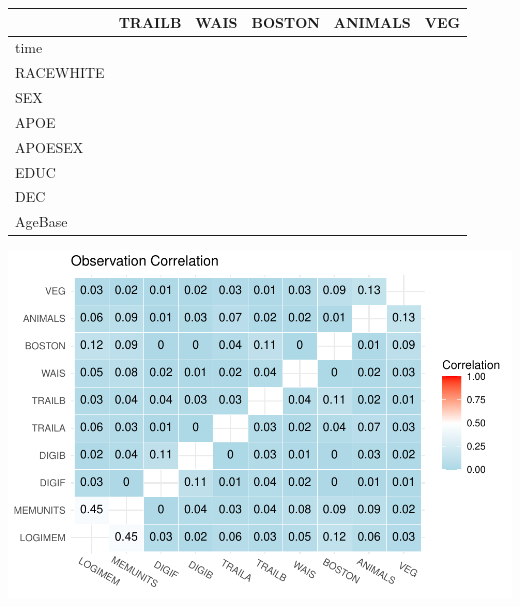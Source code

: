 \documentclass[
]{article}
\begin{document}
\begin{longtable}[t]{l|l|l|l|l|l}
\hline
  & TRAILB & WAIS & BOSTON & ANIMALS & VEG\\
\hline
time & \cellcolor{red}{-0.46 (-0.65, -0.25)} & \cellcolor{red}{-0.19 (-0.34, -0.02)} & \cellcolor{white}{-0.06 (-0.28, 0.12)} & \cellcolor{red}{-0.20 (-0.37, -0.02)} & \cellcolor{white}{-0.13 (-0.32, 0.05)}\\
\hline
RACEWHITE & \cellcolor{white}{-0.06 (-0.24, 0.11)} & \cellcolor{red}{-0.24 (-0.36, -0.11)} & \cellcolor{white}{-0.13 (-0.28, 0.02)} & \cellcolor{red}{-0.31 (-0.45, -0.18)} & \cellcolor{red}{-0.30 (-0.44, -0.15)}\\
\hline
SEX & \cellcolor{white}{0.06 (-0.07, 0.19)} & \cellcolor{white}{0.02 (-0.08, 0.12)} & \cellcolor{red}{-0.16 (-0.28, -0.03)} & \cellcolor{white}{-0.08 (-0.20, 0.03)} & \cellcolor{red}{-0.16 (-0.27, -0.05)}\\
\hline
APOE & \cellcolor{white}{-0.05 (-0.23, 0.12)} & \cellcolor{white}{-0.02 (-0.16, 0.10)} & \cellcolor{white}{-0.05 (-0.22, 0.13)} & \cellcolor{white}{-0.11 (-0.27, 0.05)} & \cellcolor{white}{-0.13 (-0.30, 0.03)}\\
\hline
APOESEX & \cellcolor{white}{-0.18 (-0.40, 0.05)} & \cellcolor{white}{-0.15 (-0.31, 0.03)} & \cellcolor{white}{0.04 (-0.19, 0.25)} & \cellcolor{white}{-0.04 (-0.24, 0.17)} & \cellcolor{white}{0.04 (-0.16, 0.25)}\\
\hline
EDUC & \cellcolor{white}{-0.00 (-0.01, 0.00)} & \cellcolor{red}{-0.01 (-0.01, -0.00)} & \cellcolor{white}{-0.00 (-0.01, 0.01)} & \cellcolor{white}{0.00 (-0.01, 0.01)} & \cellcolor{white}{-0.00 (-0.01, 0.00)}\\
\hline
DEC & \cellcolor{red}{-0.27 (-0.41, -0.13)} & \cellcolor{red}{-0.31 (-0.42, -0.22)} & \cellcolor{red}{-0.33 (-0.45, -0.21)} & \cellcolor{red}{-0.14 (-0.26, -0.01)} & \cellcolor{red}{-0.20 (-0.33, -0.08)}\\
\hline
AgeBase & \cellcolor{red}{-0.01 (-0.02, -0.01)} & \cellcolor{red}{-0.01 (-0.02, -0.01)} & \cellcolor{red}{-0.01 (-0.02, -0.00)} & \cellcolor{red}{-0.01 (-0.02, -0.01)} & \cellcolor{red}{-0.01 (-0.02, -0.00)}\\
\hline
\end{longtable}
\endgroup{}

\includegraphics{DataAnalysis_files/figure-latex/unnamed-chunk-3-1.pdf}
\end{document}
